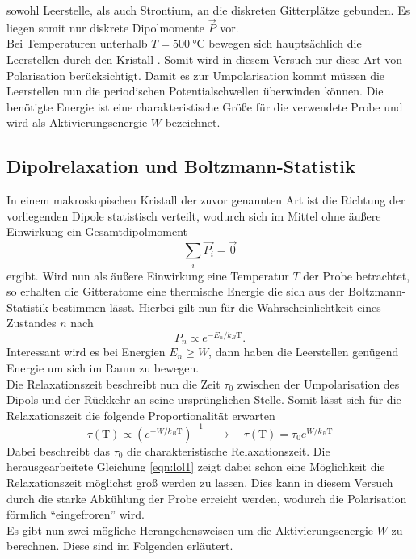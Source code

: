 sowohl Leerstelle, als auch Strontium, an die diskreten Gitterplätze gebunden. Es liegen somit nur diskrete Dipolmomente $\vec{P}$ vor.
\\
Bei Temperaturen unterhalb $T = \SI{500}{\celsius}$ bewegen sich hauptsächlich die Leerstellen durch den Kristall \cite{altskript}. Somit wird in diesem Versuch nur diese Art von Polarisation berücksichtigt.
Damit es zur Umpolarisation kommt müssen die Leerstellen nun die periodischen Potentialschwellen überwinden können. Die benötigte Energie ist eine charakteristische Größe für die verwendete Probe und wird als Aktivierungsenergie $W$ bezeichnet.

\subsection{Dipolrelaxation und Boltzmann-Statistik}
In einem makroskopischen Kristall der zuvor genannten Art ist die Richtung der vorliegenden Dipole statistisch verteilt, wodurch sich im Mittel ohne äußere Einwirkung ein Gesamtdipolmoment
\begin{equation*}
\sum_{i} \vec{P_{i}} = \vec{0}
\end{equation*}
ergibt. Wird nun als äußere Einwirkung eine Temperatur $T$ der Probe betrachtet, so erhalten die Gitteratome eine thermische Energie die sich aus der Boltzmann-Statistik bestimmen lässt.
Hierbei gilt nun für die Wahrscheinlichtkeit eines Zustandes $n$ nach \cite{Briels2016}
\begin{equation*}
P_n \propto e^{- E_n / k_{B}\text{T}}.
\end{equation*}
Interessant wird es bei Energien $E_n \geq W$, dann haben die Leerstellen genügend Energie um sich im Raum zu bewegen.
\\
Die Relaxationszeit beschreibt nun die Zeit $\tau_0$ zwischen der Umpolarisation des Dipols und der Rückkehr an seine ursprünglichen Stelle.
Somit lässt sich für die Relaxationszeit die folgende Proportionalität erwarten
\begin{equation}
    \label{eqn:lol1}
\tau(\text{T}) \propto  \left( e^{- W / k_{B}\text{T}}\right)^{-1} \quad \to \quad \tau(\text{T}) = \tau_0  e^{ W / k_{B}\text{T}}
\end{equation}
Dabei beschreibt das $\tau_0$ die charakteristische Relaxationszeit.
Die herausgearbeitete Gleichung \eqref{eqn:lol1} zeigt dabei schon eine Möglichkeit die Relaxationszeit möglichst groß werden zu lassen. Dies kann in diesem Versuch durch die starke Abkühlung der Probe
erreicht werden, wodurch die Polarisation förmlich \enquote{eingefroren} wird.
\\
Es gibt nun zwei mögliche Herangehensweisen um die Aktivierungsenergie $W$ zu berechnen. Diese sind im Folgenden erläutert.

